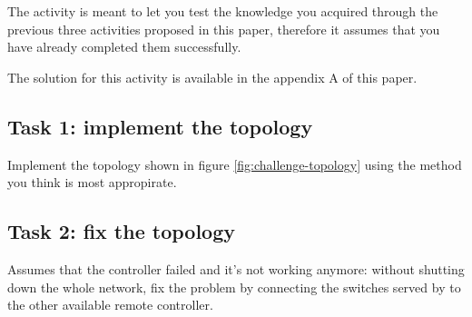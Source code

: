 The activity is meant to let you test the knowledge you acquired through the
previous three activities proposed in this paper, therefore it assumes that you
have already completed them successfully.

The solution for this activity is available in the appendix A of this paper.



\subsection*{Task 1: implement the topology}
Implement the topology shown in figure \ref{fig:challenge-topology} using the method
you think is most appropirate.

\subsection*{Task 2: fix the topology}
Assumes that the controller  failed and it's not working anymore: without
shutting down the whole network, fix the problem by connecting the switches served by 
to the other available remote controller.
